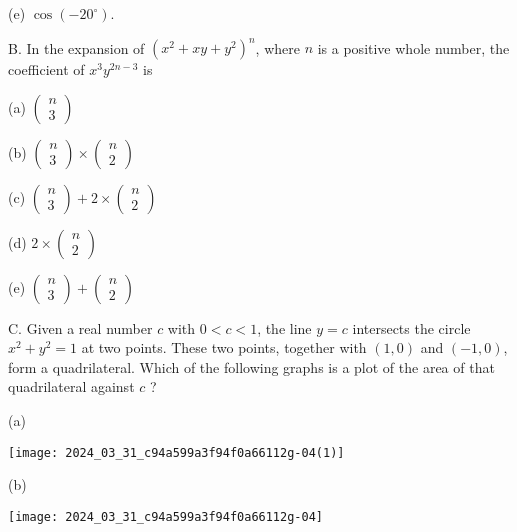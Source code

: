 \documentclass[10pt]{article}
\begin{document}
(e) $\cos \left(-20^{\circ}\right)$.

B. In the expansion of $\left(x^{2}+x y+y^{2}\right)^{n}$, where $n$ is a positive whole number, the coefficient of $x^{3} y^{2 n-3}$ is

(a) $\left(\begin{array}{l}n \\ 3\end{array}\right)$

(b) $\left(\begin{array}{l}n \\ 3\end{array}\right) \times\left(\begin{array}{l}n \\ 2\end{array}\right)$

(c) $\left(\begin{array}{l}n \\ 3\end{array}\right)+2 \times\left(\begin{array}{l}n \\ 2\end{array}\right)$

(d) $2 \times\left(\begin{array}{l}n \\ 2\end{array}\right)$

(e) $\left(\begin{array}{l}n \\ 3\end{array}\right)+\left(\begin{array}{l}n \\ 2\end{array}\right)$

C. Given a real number $c$ with $0<c<1$, the line $y=c$ intersects the circle $x^{2}+y^{2}=1$ at two points. These two points, together with $(1,0)$ and $(-1,0)$, form a quadrilateral. Which of the following graphs is a plot of the area of that quadrilateral against $c$ ?

(a)

\begin{center}
\texttt{[image: 2024\_03\_31\_c94a599a3f94f0a66112g-04(1)]}
\end{center}

(b)

\begin{center}
\texttt{[image: 2024\_03\_31\_c94a599a3f94f0a66112g-04]}
\end{center}
\end{document}
